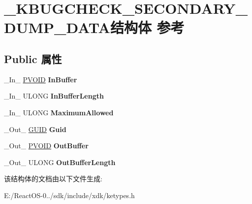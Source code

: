 \hypertarget{struct___k_b_u_g_c_h_e_c_k___s_e_c_o_n_d_a_r_y___d_u_m_p___d_a_t_a}{}\section{\+\_\+\+K\+B\+U\+G\+C\+H\+E\+C\+K\+\_\+\+S\+E\+C\+O\+N\+D\+A\+R\+Y\+\_\+\+D\+U\+M\+P\+\_\+\+D\+A\+T\+A结构体 参考}
\label{struct___k_b_u_g_c_h_e_c_k___s_e_c_o_n_d_a_r_y___d_u_m_p___d_a_t_a}
\subsection*{Public 属性}
\begin{DoxyCompactItemize}
\item 
\mbox{\label{struct___k_b_u_g_c_h_e_c_k___s_e_c_o_n_d_a_r_y___d_u_m_p___d_a_t_a_a0f67505cc0669752829d8dab6cebff42}} 
\+\_\+\+In\+\_\+ \hyperlink{interfacevoid}{P\+V\+O\+ID} {\bfseries In\+Buffer}
\item 
\mbox{\label{struct___k_b_u_g_c_h_e_c_k___s_e_c_o_n_d_a_r_y___d_u_m_p___d_a_t_a_a593c698e8d41726d49586b6b65b59a43}} 
\+\_\+\+In\+\_\+ U\+L\+O\+NG {\bfseries In\+Buffer\+Length}
\item 
\mbox{\label{struct___k_b_u_g_c_h_e_c_k___s_e_c_o_n_d_a_r_y___d_u_m_p___d_a_t_a_a4c5818835dd6fe57e445852864567057}} 
\+\_\+\+In\+\_\+ U\+L\+O\+NG {\bfseries Maximum\+Allowed}
\item 
\mbox{\label{struct___k_b_u_g_c_h_e_c_k___s_e_c_o_n_d_a_r_y___d_u_m_p___d_a_t_a_af460493a4e9ae0767da68e033a891a77}} 
\+\_\+\+Out\+\_\+ \hyperlink{interface_g_u_i_d}{G\+U\+ID} {\bfseries Guid}
\item 
\mbox{\label{struct___k_b_u_g_c_h_e_c_k___s_e_c_o_n_d_a_r_y___d_u_m_p___d_a_t_a_a351ae7b64671360ce0cb958aeeb89800}} 
\+\_\+\+Out\+\_\+ \hyperlink{interfacevoid}{P\+V\+O\+ID} {\bfseries Out\+Buffer}
\item 
\mbox{\label{struct___k_b_u_g_c_h_e_c_k___s_e_c_o_n_d_a_r_y___d_u_m_p___d_a_t_a_a7600fe43476784fcdf744360ac206b0a}} 
\+\_\+\+Out\+\_\+ U\+L\+O\+NG {\bfseries Out\+Buffer\+Length}
\end{DoxyCompactItemize}


该结构体的文档由以下文件生成\+:\begin{DoxyCompactItemize}
\item 
E\+:/\+React\+O\+S-\/0../sdk/include/xdk/ketypes.\+h\end{DoxyCompactItemize}
